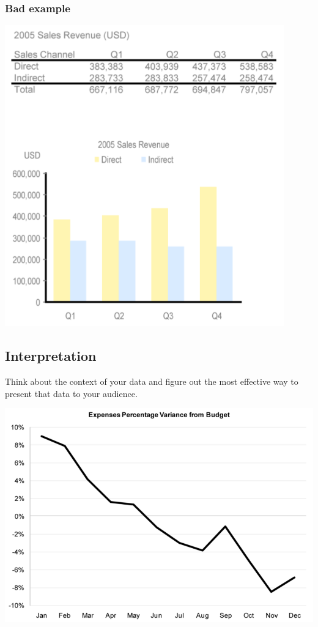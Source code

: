 \documentclass[11pt]{article}
\begin{document}
\subsubsection{Bad example}
\label{sec:org46ce965}
\begin{center}
\includegraphics[width=.9\linewidth]{./images/non-data-ink-example.png}
\end{center}

 \newpage
\subsection{Interpretation}
\label{sec:orga44dd95}
Think about the context of your data and figure out the most effective way to present that data to your audience.

\begin{center}
\includegraphics[width=.9\linewidth]{./images/interpretation-example.png}
\end{center}
\end{document}
